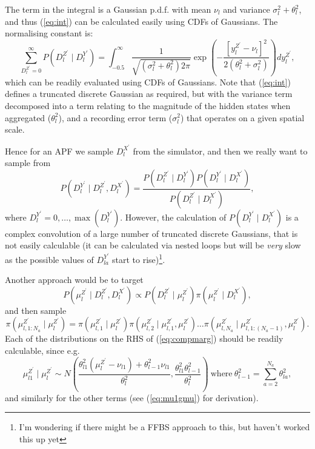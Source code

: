 \documentclass[a4paper]{article}
\begin{document}
The term in the integral is a Gaussian p.d.f. with mean $\nu_l$ and variance $\sigma^2_l + \theta^2_l$, and thus (\ref{eq:int}) can be calculated easily using CDFs of Gaussians. The normalising constant is:
\begin{equation*}
    \sum_{D^{Z^\prime}_l = 0}^\infty P\left(D^{Z^\prime}_l \mid D^{Y^\prime}_l\right) = \int_{-0.5}^\infty \frac{1}{\sqrt{\left(\sigma^2_l + \theta^2_l\right)2\pi}} \exp\left(-\frac{\left[y^{Z^\prime}_l - \nu_l\right]^2}{2\left(\theta^2_l + \sigma^2_l\right)}\right)dy^{Z^\prime}_l,
\end{equation*}
which can be readily evaluated using CDFs of Gaussians. Note that (\ref{eq:int}) defines a truncated discrete Gaussian as required, but with the variance term decomposed into a term relating to the magnitude of the hidden states when aggregated ($\theta^2_l$), and a recording error term ($\sigma^2_l$) that operates on a given spatial scale.

Hence for an APF we sample $D^{X^\prime}_l$ from the simulator, and then we really want to sample from
\begin{equation}
    P\left(D^{Y^\prime}_l \mid D^{Z^\prime}_l, D^{X^\prime}_l\right) = \frac{P\left(D^{Z^\prime}_l \mid D^{Y^\prime}_l\right)P\left(D^{Y^\prime}_l \mid D^{X^\prime}_l\right)}{P\left(D^{Z^\prime}_l \mid D^{X^\prime}_l\right)},
\end{equation}
where $D^{Y^\prime}_l = 0, \dots, \max\left(D^{Y^\prime}_l\right)$. However, the calculation of $P\left(D^{Y^\prime}_l \mid D^{X^\prime}_l\right)$ is a complex convolution of a large number of truncated discrete Gaussians, that is not easily calculable (it can be calculated via nested loops but will be \textit{very} slow as the possible values of $D^{Y^\prime}_{la}$ start to rise)\footnote{I'm wondering if there might be a FFBS approach to this, but haven't worked this up yet}.

Another approach would be to target
\begin{equation}
    P\left(\mu^{Z^\prime}_l \mid D^{Z^\prime}_l, D^{X^\prime}_l\right) \propto P\left(D^{Z^\prime}_l \mid \mu^{Z^\prime}_l\right)\pi\left(\mu^{Z^\prime}_l \mid D^{X^\prime}_l\right), \label{eq:mugDZ}
\end{equation}
and then sample
\begin{equation}
    \pi\left(\mu^{Z^\prime}_{l,1:N_a} \mid \mu^{Z^\prime}_l\right) = \pi\left(\mu^{Z^\prime}_{l,1} \mid \mu^{Z^\prime}_l\right)\pi\left(\mu^{Z^\prime}_{l,2} \mid \mu^{Z^\prime}_{l, 1}, \mu^{Z^\prime}_l\right)\dots\pi\left(\mu^{Z^\prime}_{l,N_a} \mid \mu^{Z^\prime}_{l, 1:(N_a - 1)}, \mu^{Z^\prime}_l\right).\label{eq:compmarg}
\end{equation}
Each of the distributions on the RHS of (\ref{eq:compmarg}) should be readily calculable, since e.g.
\begin{equation}
    \mu^{Z^\prime}_{l1} \mid \mu^{Z^\prime}_l \sim N\left(\frac{\theta^2_{l1}\left(\mu^{Z^\prime}_l - \nu_{l1}\right) + \theta^2_{l - 1}\nu_{l1}}{\theta^2_l}, \frac{\theta^2_{l1}\theta^2_{l - 1}}{\theta^2_l}\right)~\mbox{where}~\theta^2_{l - 1} = \sum_{a = 2}^{N_a} \theta^2_{la},
\end{equation}
and similarly for the other terms (see (\ref{eq:mu1gmu}) for derivation).
\end{document}
